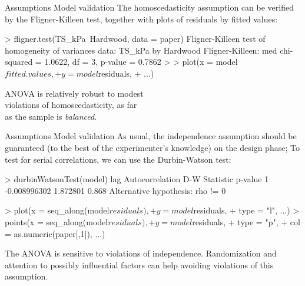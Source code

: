 \documentclass[t]{beamer}
\begin{document}

\begin{ftstf}
{Assumptions}
{Model validation}
The homoscedasticity assumption can be verified by the Fligner-Killeen test, together with plots of residuals by fitted values:
\begin{rcode}
> fligner.test(TS_kPa~Hardwood, data = paper)
Fligner-Killeen test of homogeneity of
variances
data:  TS_kPa by Hardwood
Fligner-Killeen:
med chi-squared = 1.0622, df = 3, 
p-value = 0.7862
>
> plot(x = model$fitted.values,
+ y = model$residuals, 
+ ...)
\end{rcode}
\vhalf
ANOVA is relatively robust to modest\\
violations of homoscedasticity, as far\\
as the sample is \textit{balanced}.
\end{ftstf}


\begin{ftstf}
{Assumptions}
{Model validation}
As usual, the independence assumption should be guaranteed (to the best of the experimenter's knowledge) on the design phase;
\vhalf
To test for serial correlations, we can use the Durbin-Watson test:
\vhalf
\begin{rcode}
> durbinWatsonTest(model)
 lag Autocorrelation D-W Statistic p-value
   1    -0.008996302      1.872801   0.868
 Alternative hypothesis: rho != 0

> plot(x    = seq_along(model$residuals),
+      y    = model$residuals,
+      type = "l", ...)
> points(x    = seq_along(model$residuals),
+        y    = model$residuals,
+        type = "p",
+        col  = as.numeric(paper[,1]), ...)
\end{rcode}
\vhalf
The ANOVA is sensitive to violations of independence. Randomization and attention to possibly influential factors can help avoiding violations of this assumption.
\end{ftstf}
\end{document}
